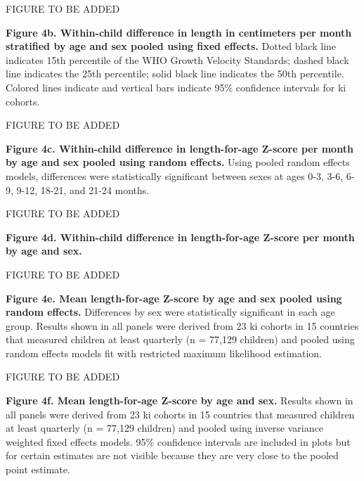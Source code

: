 \documentclass[9pt,]{article}
\begin{document}
FIGURE TO BE ADDED

\textbf{Figure 4b. Within-child difference in length in centimeters per
month stratified by age and sex pooled using fixed effects.} Dotted
black line indicates 15th percentile of the WHO Growth Velocity
Standards; dashed black line indicates the 25th percentile; solid black
line indicates the 50th percentile. Colored lines indicate and vertical
bars indicate 95\% confidence intervals for ki cohorts.

FIGURE TO BE ADDED

\textbf{Figure 4c. Within-child difference in length-for-age Z-score per
month by age and sex pooled using random effects.} Using pooled random
effects models, differences were statistically significant between sexes
at ages 0-3, 3-6, 6-9, 9-12, 18-21, and 21-24 months.

FIGURE TO BE ADDED

\textbf{Figure 4d. Within-child difference in length-for-age Z-score per
month by age and sex. }

FIGURE TO BE ADDED

\textbf{Figure 4e. Mean length-for-age Z-score by age and sex pooled
using random effects.} Differences by sex were statistically significant
in each age group. Results shown in all panels were derived from 23 ki
cohorts in 15 countries that measured children at least quarterly (n =
77,129 children) and pooled using random effects models fit with
restricted maximum likelihood estimation.

FIGURE TO BE ADDED

\textbf{Figure 4f. Mean length-for-age Z-score by age and sex.} Results
shown in all panels were derived from 23 ki cohorts in 15 countries that
measured children at least quarterly (n = 77,129 children) and pooled
using inverse variance weighted fixed effects models. 95\% confidence
intervals are included in plots but for certain estimates are not
visible because they are very close to the pooled point estimate.
\end{document}
